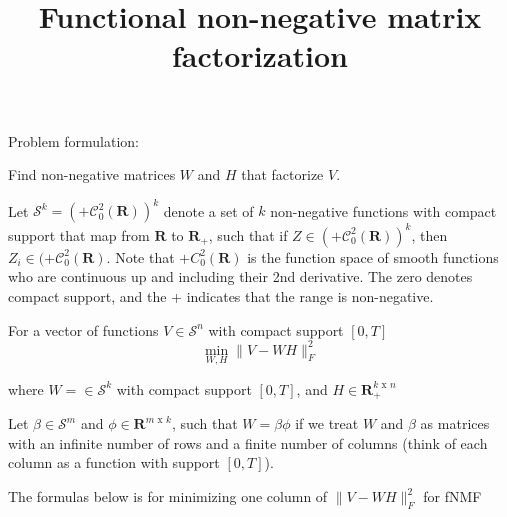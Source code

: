 \documentclass{article}
\title{Functional non-negative matrix factorization}
\begin{document}
  \maketitle

  Problem formulation:
  
  Find non-negative matrices $W$ and $H$ that factorize $V$.

  Let $\mathcal{S}^k = (+\mathcal{C}_0^2(\mathbf{R}))^k$ denote a set of $k$ non-negative functions with compact support that map from $\mathbf{R}$ to $\mathbf{R}_+$, such that if $Z \in (+\mathcal{C}_0^2(\mathbf{R}))^k$, then $Z_i \in (+\mathcal{C}_0^2(\mathbf{R})$.
  Note that $+C_0^2(\mathbf{R})$ is the function space of smooth functions who are continuous up and including their 2nd derivative. The zero denotes compact support, and the + indicates that the range is non-negative.

  For a vector of functions $V \in \mathcal{S}^n$ with compact support $[0, T]$
  \[
  \min_{W,H} \|V - W H\|_F^2
  \]

  where $W = \in \mathcal{S}^k$ with compact support $[0, T]$, and $H \in \mathbf{R}_+^{k \text{ x } n}$

  Let $\beta \in \mathcal{S}^m$ and $\phi \in \mathbf{R}^{m \text{ x } k}$, such that $W = \beta \phi$ if we treat $W$ and $\beta$ as matrices with an infinite number of rows and a finite number of columns (think of each column as a function with support $[0,T]$).

  The formulas below is for minimizing one column of $\|V - W H\|_F^2$ for fNMF

  
  
\end{document}
